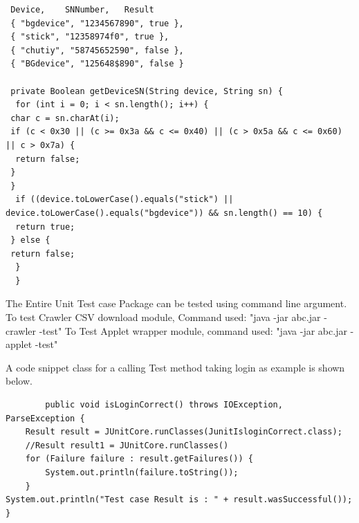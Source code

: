 \documentclass[article,type=msc,colorback,accentcolor=tud9c,twoside,11pt]{tudthesis}
\begin{document}
\begin{lstlisting}
 Device, 	SNNumber, 	Result
 { "bgdevice", "1234567890", true },
 { "stick", "12358974f0", true },
 { "chutiy", "58745652590", false },
 { "BGdevice", "125648$890", false }
 
 private Boolean getDeviceSN(String device, String sn) {
  for (int i = 0; i < sn.length(); i++) {
 char c = sn.charAt(i);
 if (c < 0x30 || (c >= 0x3a && c <= 0x40) || (c > 0x5a && c <= 0x60) || c > 0x7a) {
  return false;
 }
 }
  if ((device.toLowerCase().equals("stick") || device.toLowerCase().equals("bgdevice")) && sn.length() == 10) {
  return true;
 } else {
 return false;
  }
  }
\end{lstlisting}
The Entire Unit Test case Package can be tested using command line argument.
To test Crawler CSV download module, Command used:\newline
"java -jar abc.jar -crawler -test"\newline 
To Test Applet wrapper module, command used:\newline
"java -jar abc.jar - applet -test"
 
A code snippet class for a calling Test method taking login as example is shown below.
\begin{lstlisting}
		public void isLoginCorrect() throws IOException, ParseException {
	Result result = JUnitCore.runClasses(JunitIsloginCorrect.class);
	//Result result1 = JUnitCore.runClasses()
	for (Failure failure : result.getFailures()) {
		System.out.println(failure.toString());
	}
System.out.println("Test case Result is : " + result.wasSuccessful());
}
\end{lstlisting}
\end{document}
